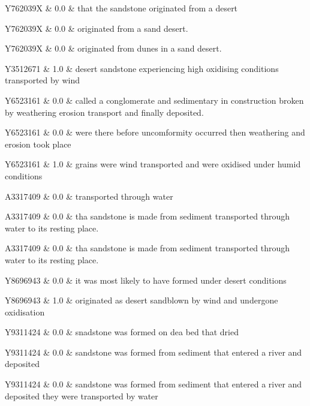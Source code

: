 Y762039X & 0.0 & that the sandstone originated from a desert 
 \\ 

Y762039X & 0.0 & originated from a sand desert. 
 \\ 

Y762039X & 0.0 & originated from dunes in a sand desert. 
 \\ 

Y3512671 & 1.0 & desert sandstone experiencing high oxidising conditions transported by wind 
 \\ 

Y6523161 & 0.0 & called a conglomerate and sedimentary in construction broken by weathering erosion transport and finally deposited. 
 \\ 

Y6523161 & 0.0 & were there before uncomformity occurred then weathering and erosion took place 
 \\ 

Y6523161 & 1.0 & grains were wind transported and were oxidised under humid conditions 
 \\ 

A3317409 & 0.0 & transported through water 
 \\ 

A3317409 & 0.0 & tha sandstone is made from sediment transported through water to its resting place. 
 \\ 

A3317409 & 0.0 & tha sandstone is made from sediment transported through water to its resting place. 
 \\ 

Y8696943 & 0.0 & it was most likely to have formed under desert conditions 
 \\ 

Y8696943 & 1.0 & originated as desert sandblown by wind and undergone oxidisation 
 \\ 

Y9311424 & 0.0 & snadstone was formed on dea bed that dried 
 \\ 

Y9311424 & 0.0 & sandstone was formed from sediment that entered a river and deposited 
 \\ 

Y9311424 & 0.0 & sandstone was formed from sediment that entered a river and deposited they were transported by water 
 \\ 

